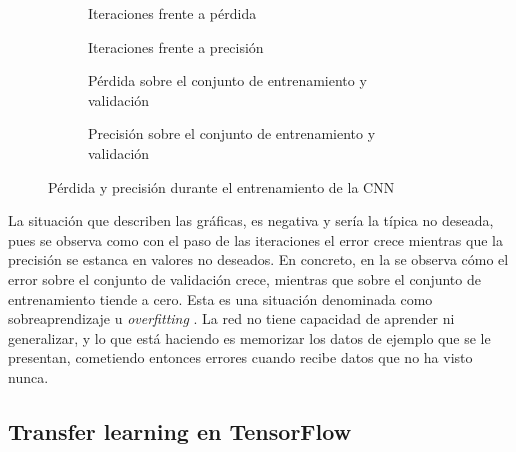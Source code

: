 			\begin{figure}[!h]
				\centering
				\begin{subfigure}{.4\textwidth}
					\centering
					
					\caption{Iteraciones frente a pérdida}
					\label{fig:tb_cnn_a}
				\end{subfigure}\hfill
				\begin{subfigure}{.4\textwidth}
					\centering
					
					\caption{Iteraciones frente a precisión}
					\label{fig:tb_cnn_b}
				\end{subfigure}
				\begin{subfigure}{.4\textwidth}
					\centering
					
					\caption{Pérdida sobre el conjunto de entrenamiento y validación}
					\label{fig:tb_cnn_c}
				\end{subfigure}\hfill
				\begin{subfigure}{.4\textwidth}
					\centering
					
					\caption{Precisión sobre el conjunto de entrenamiento y validación}
					\label{fig:tb_cnn_d}
				\end{subfigure}
				\caption{Pérdida y precisión durante el entrenamiento de la CNN}
				\label{fig:tb_cnn}
			\end{figure}
			
			La situación que describen las gráficas, es negativa y sería la típica no deseada, pues se observa como con el paso de las iteraciones el error crece mientras que la precisión se estanca en valores no deseados. En concreto, en la  se observa cómo el error sobre el conjunto de validación crece, mientras que sobre el conjunto de entrenamiento tiende a cero. Esta es una situación denominada como sobreaprendizaje u \textit{overfitting} \cite{overfitting}. La red no tiene capacidad de aprender ni generalizar, y lo que está haciendo es memorizar los datos de ejemplo que se le presentan, cometiendo entonces errores cuando recibe datos que no ha visto nunca. 
			
		\subsection{Transfer learning en TensorFlow}
		
